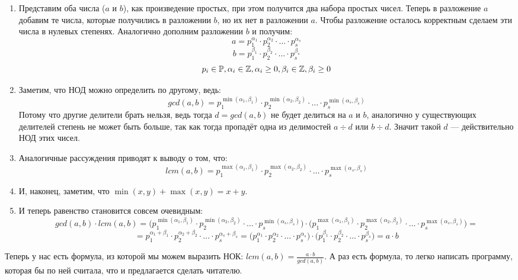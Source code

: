 \begin{enumerate}
    \item Представим оба числа ($a$ и $b$), как произведение простых, при этом получится два набора простых чисел. Теперь в разложение $a$ добавим те числа, которые получились в разложении $b$, но их нет в разложении $a$. Чтобы разложение осталось корректным сделаем эти числа в нулевых степенях. Аналогично дополним разложении $b$ и получим:
    $$a = p_1^{\alpha_1} \cdot p_2^{\alpha_2} \cdot \ldots \cdot p_s^{\alpha_s}$$
    $$b = p_1^{\beta_1} \cdot p_2^{\beta_2} \cdot \ldots \cdot p_s^{\beta_s}$$
    $$p_i \in \mathbb{P}, \alpha_i \in \mathbb{Z}, \alpha_i \geq 0, \beta_i \in \mathbb{Z}, \beta_i \geq 0 $$
    \item Заметим, что НОД можно определить по другому, ведь:
    $$gcd(a, b) = p_1^{\min{(\alpha_1, \beta_1)}} \cdot p_2^{\min{(\alpha_2, \beta_2)}} \cdot \ldots \cdot p_s^{\min{(\alpha_s, \beta_s)}}$$
    Потому что другие делители брать нельзя, ведь тогда $d = gcd(a, b)$ не будет делиться на $a$ и $b$, аналогично у существующих делителей степень не может быть больше, так как тогда пропадёт одна из делимостей $a \div d$ или $b \div d$. Значит такой $d$ — действительно НОД этих чисел.
    \item Аналогичные рассуждения приводят к выводу о том, что:
    $$lcm(a, b) = p_1^{\max{(\alpha_1, \beta_1)}} \cdot p_2^{\max{(\alpha_2, \beta_2)}} \cdot \ldots \cdot p_s^{\max{(\alpha_s, \beta_s)}}$$
    \item И, наконец, заметим, что $\min{(x, y)} + \max{(x, y)} = x + y$.
    \item И теперь равенство становится совсем очевидным:
    $$gcd(a, b) \cdot lcm(a, b) = \big( p_1^{\min{(\alpha_1, \beta_1)}} \cdot p_2^{\min{(\alpha_2, \beta_2)}} \cdot \ldots \cdot p_s^{\min{(\alpha_s, \beta_s)}} \big) \cdot \big( p_1^{\max{(\alpha_1, \beta_1)}} \cdot p_2^{\max{(\alpha_2, \beta_2)}} \cdot \ldots \cdot p_s^{\max{(\alpha_s, \beta_s)}} \big) =$$
    $$= p_1^{\alpha_1 + \beta_1} \cdot p_2^{\alpha_2 + \beta_2} \cdot \ldots \cdot p_s^{\alpha_s + \beta_s} = \big( p_1^{\alpha_1} \cdot p_2^{\alpha_2} \cdot \ldots \cdot p_s^{\alpha_s} \big) \cdot \big(  p_1^{\beta_1} \cdot p_2^{\beta_2} \cdot \ldots \cdot p_s^{\beta_s} \big) = a \cdot b$$
\end{enumerate}

Теперь у нас есть формула, из которой мы можем выразить НОК: $lcm(a, b) = \frac{a \cdot b}{gcd(a, b)}$. А раз есть формула, то легко написать программу, которая бы по ней считала, что и предлагается сделать читателю.

